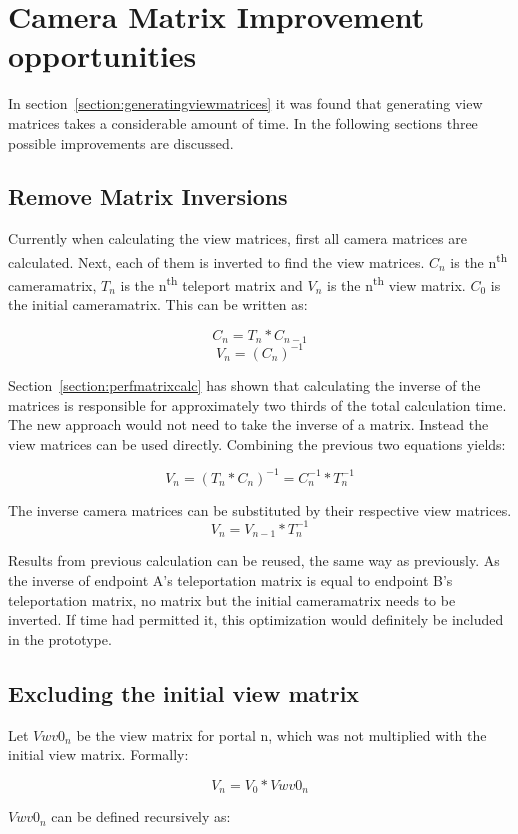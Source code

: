 \section{Camera Matrix Improvement opportunities}
In section~\ref{section:generatingviewmatrices} it was found that generating view matrices takes a considerable amount of time. In the following sections three possible improvements are discussed.

\subsection{Remove Matrix Inversions}
Currently when calculating the view matrices, first all camera matrices are calculated. Next, each of them is inverted to find the view matrices. $C_n$ is the n\textsuperscript{th} \gls{cameramatrix}, $T_n$ is the n\textsuperscript{th} teleport matrix and $V_n$ is the n\textsuperscript{th} view matrix. $C_0$ is the initial \gls{cameramatrix}. This can be written as:

$$C_n = T_{n} * C_{n-1}$$
$$V_n = (C_{n})^{-1}$$

Section~\ref{section:perfmatrixcalc} has shown that calculating the inverse of the matrices is responsible for approximately two thirds of the total calculation time. The new approach would not need to take the inverse of a matrix. Instead the view matrices can be used directly.
Combining the previous two equations yields:

$$V_n = (T_n * C_n)^{-1} = C_n^{-1} * T_n^{-1}$$

The inverse camera matrices can be substituted by their respective view matrices.
$$V_n = V_{n-1} * T_n^{-1}$$

Results from previous calculation can be reused, the same way as previously. As the inverse of \gls{endpoint} A's teleportation matrix is equal to \gls{endpoint} B's teleportation matrix, no matrix but the initial \gls{cameramatrix} needs to be inverted. If time had permitted it, this optimization would definitely be included in the prototype.

\subsection{Excluding the initial view matrix}
\label{section:noveiw}
Let $Vwv0_n$ be the view matrix for portal n, which was not multiplied with the initial view matrix. Formally:

$$V_n = V_0 * Vwv0_n$$

$Vwv0_n$ can be defined recursively as:

